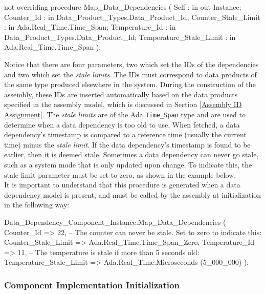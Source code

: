 \vspace{5mm} %
\begin{adacode}
not overriding procedure Map_Data_Dependencies (
  Self : in out Instance; 
  Counter_Id : in Data_Product_Types.Data_Product_Id;
  Counter_Stale_Limit : in Ada.Real_Time.Time_Span;
  Temperature_Id : in Data_Product_Types.Data_Product_Id; 
  Temperature_Stale_Limit : in Ada.Real_Time.Time_Span
);
\end{adacode}
\vspace{5mm} %

Notice that there are four parameters, two which set the IDs of the dependencies and two which set the \textit{stale limits}. The IDs must correspond to data products of the same type produced elsewhere in the system. During the construction of the assembly, these IDs are inserted automatically based on the data products specified in the assembly model, which is discussed in Section \ref{Assembly ID Assignment}.  The \textit{stale limits} are of the Ada \texttt{Time\_Span} type and are used to determine when a data dependency is too old to use. When fetched, a data dependency's timestamp is compared to a reference time (usually the current time) minus the \textit{stale limit}. If the data dependency's timestamp is found to be earlier, then it is deemed stale. Sometimes a data dependency can never go stale, such as a system mode that is only updated upon change. To indicate this, the stale limit parameter must be set to zero, as shown in the example below. \\

It is important to understand that this procedure is generated when a data dependency model is present, and must be called by the assembly at initialization in the following way:

\vspace{5mm} %
\begin{adacode}
  Data_Dependency_Component_Instance.Map_Data_Dependencies (
    Counter_Id => 22,
    -- The counter can never be stale. Set to zero to indicate this:
    Counter_Stale_Limit => Ada.Real_Time.Time_Span_Zero,
    Temperature_Id => 11,
    -- The temperature is stale if more than 5 seconds old:
    Temperature_Stale_Limit => Ada.Real_Time.Microseconds (5_000_000)
  );
\end{adacode}
\vspace{5mm} %

\subsubsection{Component Implementation Initialization} \label{Component Implementation Initialization}

